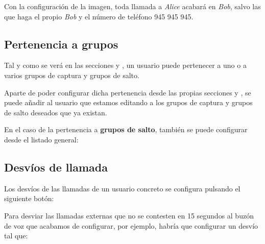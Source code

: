 \documentclass[letterpaper,10pt,spanish]{sphinxmanual}
\begin{document}
Con la configuración de la imagen, toda llamada a \emph{Alice} acabará en \emph{Bob}, salvo las que haga el propio \emph{Bob} y el número de teléfono 945 945 945.


\subsection{Pertenencia a grupos}
\label{pbx_features/users:pertenencia-a-grupos}
\noindent{}

Tal y como se verá en las secciones {\hyperref[pbx_features/huntgroups:huntgroups]{}} y {\hyperref[pbx_features/call_captures:capture\string-groups]{}}, un usuario puede pertenecer a uno o a varios grupos de captura y grupos de salto.

Aparte de poder configurar dicha pertenencia desde las propias secciones {\hyperref[pbx_features/huntgroups:huntgroups]{}} y {\hyperref[pbx_features/call_captures:capture\string-groups]{}}, se puede añadir al usuario que estamos editando a los grupos de captura y grupos de salto deseados que ya existan.

En el caso de la pertenencia a \textbf{grupos de salto}, también se puede configurar desde el listado general:



\subsection{Desvíos de llamada}
\label{pbx_features/users:desvios-de-llamada}
Los desvíos de las llamadas de un usuario concreto se configura pulsando el siguiente botón:

\label{pbx_features/users:fwd-to-vm}
Para desviar las llamadas externas que no se contesten en 15 segundos al buzón de voz que acabamos de configurar, por ejemplo, habría que configurar un desvío tal que:

\end{document}

